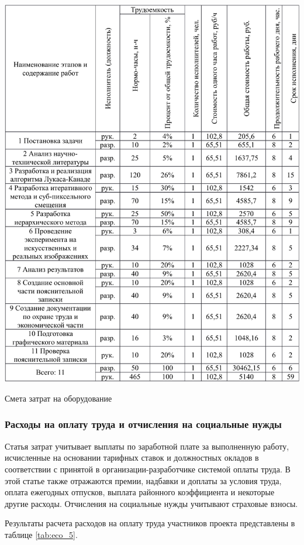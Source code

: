 \begin{table}[h!]
\centering
\includegraphics[page=4, width=0.9\linewidth]{econom_table.pdf}
\caption{Смета затрат на оборудование}
\label{tab:eco_4}
\end{table}

\subsubsection{Расходы на оплату труда и отчисления на социальные нужды}

Статья затрат учитывает выплаты по заработной плате за выполненную работу, исчисленные на основании тарифных ставок и должностных окладов в соответствии с принятой в организации-разработчике системой оплаты труда. В этой статье также отражаются премии, надбавки и доплаты за условия труда, оплата ежегодных отпусков, выплата районного коэффициента и некоторые другие расходы. Отчисления на социальные нужды учитывают страховые взносы.

Результаты расчета расходов на оплату труда участников проекта представлены в таблице \ref{tab:eco_5}.


